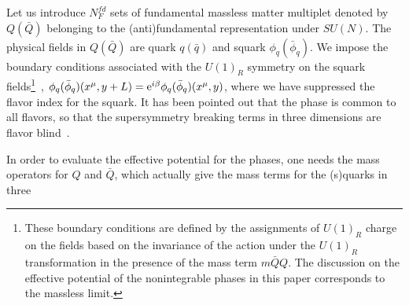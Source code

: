 \documentclass[a4paper,12pt]{article}
\begin{document}
\par
Let us introduce $N_F^{fd}$ sets of fundamental massless matter 
multiplet denoted by $Q (\bar Q)$ belonging 
to the (anti)fundamental representation
under $SU(N)$. The physical fields in $Q ({\bar Q})$
are quark $q ({\bar q})$ and squark $\phi_q ({\bar\phi}_q)$.
We impose the boundary conditions associated with 
the $U(1)_R$ symmetry on the squark 
fields\footnote{These boundary 
conditions are defined by the assignments of $U(1)_R$ charge
on the fields based on the invariance of the action under the
$U(1)_R$ transformation in the presence of
the mass term $m{\bar Q}Q$. 
The discussion on the effective potential of the 
nonintegrable phases in this paper corresponds to the 
massless limit.}~\cite{takenaga}, $\phi_q ({\bar\phi}_q)(x^{\mu}, y+L)
={\rm e}^{i\beta}\phi_q ({\bar\phi}_q)(x^{\mu}, y)$,
where we have suppressed the flavor index for the squark.
It has been pointed out that the
phase is common to all flavors, so that the 
supersymmetry breaking terms in three dimensions are flavor 
blind~\cite{takenaga, takenagac}.
\par
In order to evaluate the effective potential for the
phases, one needs the mass operators for $Q$ and $\bar Q$, which actually 
give the mass terms for the (s)quarks in three
\end{document}
